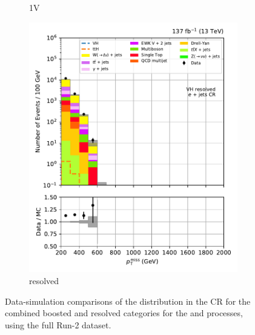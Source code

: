 \begin{figure}[htbp]
\begin{subfigure}[b]{0.24\textwidth}
        \caption{\VH 1V}
    \end{subfigure}
    \hfill
    \begin{subfigure}[b]{0.24\textwidth}
        \includegraphics[width=\textwidth]{figures/region_plots/full_Run2/region_3/VH_resolved.pdf}
        \caption{\VH resolved}
    \end{subfigure}
    \caption[Data-simulation comparisons of the \ptmiss distribution in the \singleEleCr control region for the combined boosted and resolved categories for the \ttH and \VH processes, using the full Run-2 dataset]{Data-simulation comparisons of the \ptmiss distribution in the \singleEleCr \gls{CR} for the combined boosted and resolved categories for the \ttH and \VH processes, using the full Run-2 dataset.}
    \label{fig:htoinv_cr_yields_comb2016to18_single_electron}
\end{figure}

